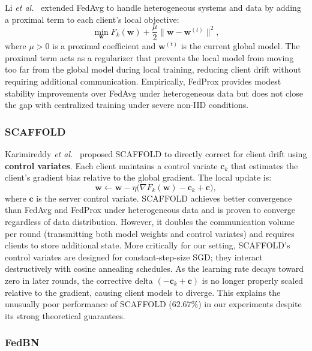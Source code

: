 \documentclass[journal,twoside]{IEEEtran}
\newcommand{\etal}{\textit{et al.}\xspace}
\begin{document}
Li \etal~\cite{li2020fedprox} extended FedAvg to handle heterogeneous
systems and data by adding a proximal term to each client's local
objective:
\begin{equation}
  \min_{\mathbf{w}} F_k(\mathbf{w}) + \frac{\mu}{2}
  \|\mathbf{w} - \mathbf{w}^{(t)}\|^2,
  \label{eq:fedprox}
\end{equation}
where $\mu > 0$ is a proximal coefficient and $\mathbf{w}^{(t)}$ is
the current global model. The proximal term acts as a regularizer that
prevents the local model from moving too far from the global model
during local training, reducing client drift without requiring
additional communication. Empirically, FedProx provides modest
stability improvements over FedAvg under heterogeneous data but does
not close the gap with centralized training under severe non-IID
conditions.

\subsubsection{SCAFFOLD}

Karimireddy \etal~\cite{karimireddy2020scaffold} proposed SCAFFOLD to
directly correct for client drift using \textbf{control variates}. Each
client maintains a control variate $\mathbf{c}_k$ that estimates the
client's gradient bias relative to the global gradient. The local
update is:
\begin{equation}
  \mathbf{w} \leftarrow \mathbf{w} - \eta\bigl(\nabla F_k(\mathbf{w})
  - \mathbf{c}_k + \mathbf{c}\bigr),
  \label{eq:scaffold}
\end{equation}
where $\mathbf{c}$ is the server control variate. SCAFFOLD achieves
better convergence than FedAvg and FedProx under heterogeneous data
and is proven to converge regardless of data distribution. However,
it doubles the communication volume per round (transmitting both model
weights and control variates) and requires clients to store additional
state. More critically for our setting, SCAFFOLD's control variates are
designed for constant-step-size SGD; they interact destructively with
cosine annealing schedules. As the learning rate decays toward zero in
later rounds, the corrective delta $(-\mathbf{c}_k + \mathbf{c})$ is
no longer properly scaled relative to the gradient, causing client
models to diverge. This explains the unusually poor performance of
SCAFFOLD ($62.67\%$) in our experiments despite its strong theoretical
guarantees.

\subsubsection{FedBN}
\end{document}

